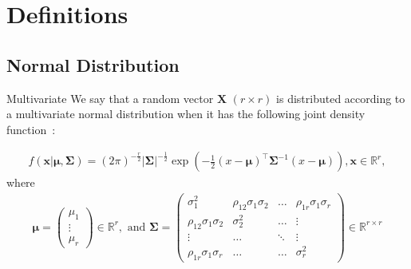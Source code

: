 \documentclass[10pt]{beamer}
\numberwithin{equation}{section}
\begin{document}
    \section{Definitions}\label{sec:definitions}

    \subsection{Normal Distribution}\label{subsec:normal-distribution}



    \begin{frame}{Multivariate}
        We say that a random vector $\bm{X}$ $(r \times r)$
        is distributed according to a multivariate normal distribution
        when it has the following joint density function~\autocite[p. 59]{izenman_modern_2008}:

        \begin{definition}
            \begin{align}
                f(\bm{x}| \bm{\mu}, \bm{\Sigma})
                = (2\pi)^{-\frac{r}{2}}
                \left|\bm{\Sigma}\right|^{-\frac{1}{2}}
                \exp\left(-\frac{1}{2}(x-\bm{\mu})^\top \bm{\Sigma}^{-1} (x-\bm{\mu})\right),
                \bm{x} \in \mathbb{R}^r,
            \end{align}
            where
            \begin{align}
                \bm{\mu} =
                \begin{pmatrix}
                    \mu_1  \\
                    \vdots \\
                    \mu_r
                \end{pmatrix}
                \in \mathbb{R}^r,
                \text{ and }
                \bm{\Sigma} =
                \begin{pmatrix}
                    \sigma_1^2                & \rho_{12}\sigma_1\sigma_2 & \ldots & \rho_{1r}\sigma_1\sigma_r \\
                    \rho_{12}\sigma_1\sigma_2 & \sigma_2^2                & \ldots & \vdots                    \\
                    \vdots                    & \ldots                    & \ddots & \vdots                    \\
                    \rho_{1r}\sigma_1\sigma_r & \ldots                    & \ldots & \sigma_r^2
                \end{pmatrix}
                \in \mathbb{R}^{r\times r}
            \end{align}
        \end{definition}
    \end{frame}
\end{document}
